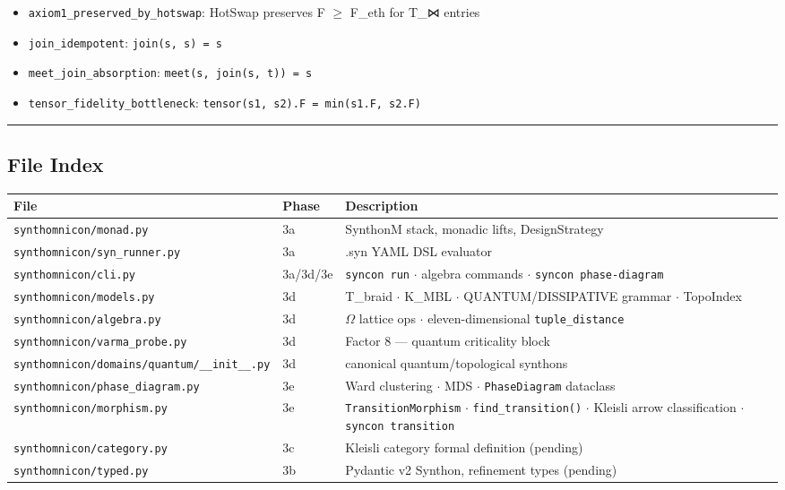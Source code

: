 \documentclass[12pt,a4paper]{article}
\begin{document}
\begin{itemize}
    \item \texttt{axiom1\_preserved\_by\_hotswap}: HotSwap preserves F $\geq$ F\_eth for T\_⋈ entries
    \item \texttt{join\_idempotent}: \texttt{join(s, s) = s}
    \item \texttt{meet\_join\_absorption}: \texttt{meet(s, join(s, t)) = s}
    \item \texttt{tensor\_fidelity\_bottleneck}: \texttt{tensor(s1, s2).F = min(s1.F, s2.F)}
\end{itemize}

\begin{center}
\rule{0.5\textwidth}{0.4pt}
\end{center}

\subsection{File Index}

\begin{table}[htbp]
\centering
\small
{}
\begin{tabularx}{\textwidth}{>{\centering\arraybackslash}X >{\centering\arraybackslash}X >{\centering\arraybackslash}X}
\toprule
\rowcolor{gray!25}\textbf{File} & \textbf{Phase} & \textbf{Description} \\
\midrule
\rowcolors{1}{white}{gray!10}
\texttt{synthomnicon/monad.py} & 3a & SynthonM stack, monadic lifts, DesignStrategy \\
\texttt{synthomnicon/syn\_runner.py} & 3a & .syn YAML DSL evaluator \\
\texttt{synthomnicon/cli.py} & 3a/3d/3e & \texttt{syncon run} $\cdot$ algebra commands $\cdot$ \texttt{syncon phase-diagram} \\
\texttt{synthomnicon/models.py} & 3d & T\_braid $\cdot$ K\_MBL $\cdot$ QUANTUM/DISSIPATIVE grammar $\cdot$ TopoIndex \\
\texttt{synthomnicon/algebra.py} & 3d & $\Omega$ lattice ops $\cdot$ eleven-dimensional \texttt{tuple\_distance} \\
\texttt{synthomnicon/varma\_probe.py} & 3d & Factor 8 --- quantum criticality block \\
\texttt{synthomnicon/domains/quantum/\_\_init\_\_.py} & 3d & 8 canonical quantum/topological synthons \\
\texttt{synthomnicon/phase\_diagram.py} & 3e & Ward clustering $\cdot$ MDS $\cdot$ \texttt{PhaseDiagram} dataclass \\
\texttt{synthomnicon/morphism.py} & 3e & \texttt{TransitionMorphism} $\cdot$ \texttt{find\_transition()} $\cdot$ Kleisli arrow classification $\cdot$ \texttt{syncon transition} \\
\texttt{synthomnicon/category.py} & 3c & Kleisli category formal definition (pending) \\
\texttt{synthomnicon/typed.py} & 3b & Pydantic v2 Synthon, refinement types (pending) \\
\bottomrule
\end{tabularx}
\end{table}
\end{document}
